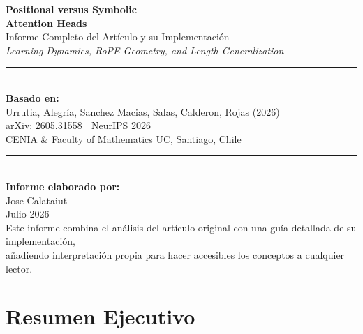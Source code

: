 \documentclass[12pt,a4paper,oneside]{report}
\begin{document}
\begin{titlepage}
\centering
\vspace*{3cm}

{\LARGE\bfseries Positional versus Symbolic\\[6pt]
Attention Heads}\\[12pt]

{\Large Informe Completo del Artículo y su Implementación}\\[8pt]

{\large\textit{Learning Dynamics, RoPE Geometry, and Length Generalization}}\\[24pt]

\rule{0.6\textwidth}{0.5pt}\\[18pt]

{\large\textbf{Basado en:}}\\[4pt]
{\large Urrutia, Alegría, Sanchez Macias, Salas, Calderon, Rojas (2026)}\\[6pt]
{\large arXiv: 2605.31558 \;$\vert$\; NeurIPS 2026}\\[6pt]
{\large CENIA \& Faculty of Mathematics UC, Santiago, Chile}\\[30pt]

\rule{0.6\textwidth}{0.5pt}\\[18pt]

{\large\textbf{Informe elaborado por:}}\\[4pt]
{\large Jose Calataiut}\\[6pt]
{\large Julio 2026}\\[40pt]

\vfill
{\small Este informe combina el análisis del artículo original con una guía detallada de su implementación, \\
añadiendo interpretación propia para hacer accesibles los conceptos a cualquier lector.}
\end{titlepage}

\tableofcontents
\newpage

\chapter*{Resumen Ejecutivo}
\end{document}
